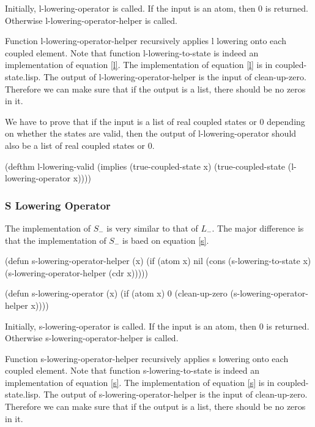 \documentclass[12pt,journal,compsoc]{IEEEtran}
\begin{document}
Initially, l-lowering-operator is called. If the input is an atom, then 0 is returned. Otherwise l-lowering-operator-helper is called.

Function l-lowering-operator-helper recursively applies l lowering onto each coupled element. Note that function l-lowering-to-state is indeed an implementation of equation \ref{l}. The implementation of equation \ref{l} is in coupled-state.lisp. The output of l-lowering-operator-helper is the input of clean-up-zero. Therefore we can make sure that if the output is a list, there should be no zeros in it.

We have to prove that if the input is a list of real coupled states or 0 depending on whether the states are valid, then the output of l-lowering-operator should also be a list of real coupled states or 0.

\begin{acl2-lst}
(defthm l-lowering-valid 
 (implies (true-coupled-state x)
  (true-coupled-state (l-lowering-operator x))))
\end{acl2-lst}

\subsubsection{S Lowering Operator}

The implementation of $S_{-}$  is very similar to that of $L_{-}$. The major difference is that the implementation of $S_{-}$ is baed on equation \ref{s}. 

\begin{acl2-lst}
(defun s-lowering-operator-helper (x)
 (if (atom x)
  nil
  (cons (s-lowering-to-state x) 
   (s-lowering-operator-helper (cdr x)))))

(defun s-lowering-operator (x)
 (if (atom x)
  0
  (clean-up-zero (s-lowering-operator-helper x))))
\end{acl2-lst}

Initially, s-lowering-operator is called. If the input is an atom, then 0 is returned. Otherwise s-lowering-operator-helper is called.

Function s-lowering-operator-helper recursively applies s lowering onto each coupled element. Note that function s-lowering-to-state is indeed an implementation of equation \ref{s}. The implementation of equation \ref{s} is in coupled-state.lisp. The output of s-lowering-operator-helper is the input of clean-up-zero. Therefore we can make sure that if the output is a list, there should be no zeros in it.
\end{document}

